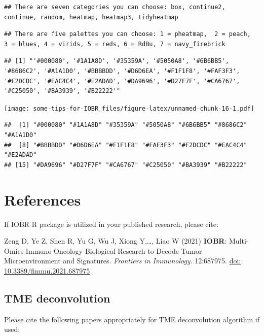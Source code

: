 \documentclass[
  12pt,
]{book}
\begin{document}
\begin{verbatim}
## There are seven categories you can choose: box, continue2, continue, random, heatmap, heatmap3, tidyheatmap
\end{verbatim}

\begin{verbatim}
## There are five palettes you can choose: 1 = pheatmap,  2 = peach,  3 = blues, 4 = virids, 5 = reds, 6 = RdBu, 7 = navy_firebrick
\end{verbatim}

\begin{verbatim}
## [1] "'#000080', '#1A1A8D', '#35359A', '#5050A8', '#6B6BB5', '#8686C2', '#A1A1D0', '#BBBBDD', '#D6D6EA', '#F1F1F8', '#FAF3F3', '#F2DCDC', '#EAC4C4', '#E2ADAD', '#DA9696', '#D27F7F', '#CA6767', '#C25050', '#BA3939', '#B22222'"
\end{verbatim}

\texttt{[image: some-tips-for-IOBR\_files/figure-latex/unnamed-chunk-16-1.pdf]}

\begin{verbatim}
##  [1] "#000080" "#1A1A8D" "#35359A" "#5050A8" "#6B6BB5" "#8686C2" "#A1A1D0"
##  [8] "#BBBBDD" "#D6D6EA" "#F1F1F8" "#FAF3F3" "#F2DCDC" "#EAC4C4" "#E2ADAD"
## [15] "#DA9696" "#D27F7F" "#CA6767" "#C25050" "#BA3939" "#B22222"
\end{verbatim}

\hypertarget{references-7}{%
\chapter{\texorpdfstring{\textbf{References}}{References}}\label{references-7}}

If IOBR R package is utilized in your published research, please cite:

Zeng D, Ye Z, Shen R, Yu G, Wu J, Xiong Y,\ldots, Liao W (2021) \textbf{IOBR}: Multi-Omics Immuno-Oncology Biological Research to Decode Tumor Microenvironment and Signatures. \emph{Frontiers in Immunology}. 12:687975. \href{https://www.frontiersin.org/articles/10.3389/fimmu.2021.687975/full}{doi: 10.3389/fimmu.2021.687975}

\hypertarget{tme-deconvolution-1}{%
\section{TME deconvolution}\label{tme-deconvolution-1}}

Please cite the following papers appropriately for TME deconvolution algorithm if used:
\end{document}
